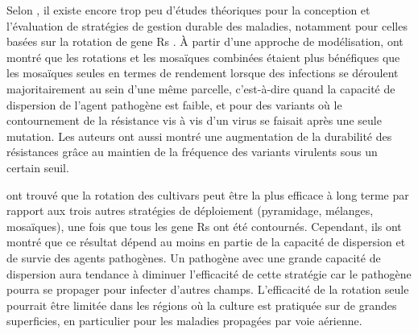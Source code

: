  Selon \citet{Zhan2015}, il existe encore trop peu d’études théoriques pour la conception et l’évaluation de stratégies  de gestion durable des maladies, notamment pour celles basées sur la rotation de \glspl{gene R} \citep{Fabre2015, Papaix2015, Lof2017, Rimbaud2018}. 
À partir d'une approche de modélisation, \citet{Fabre2015}  ont montré que les rotations et les mosaïques combinées  étaient plus bénéfiques que les mosaïques seules en termes de rendement lorsque des infections se déroulent majoritairement au sein d'une même parcelle, c'est-à-dire quand la capacité de dispersion de l'agent pathogène est faible, et pour des variants  où le contournement de la résistance vis à vis d'un virus se faisait après une seule mutation. Les auteurs ont aussi montré une augmentation de la durabilité des résistances grâce au maintien de  la fréquence des variants virulents sous un certain seuil.

	\citet{Rimbaud2018} ont trouvé que la rotation des cultivars peut être la plus efficace à long terme par rapport aux trois autres stratégies de déploiement (pyramidage, mélanges, mosaïques), une fois que tous les \glspl{gene R} ont été contournés. Cependant, ils ont montré que ce résultat dépend au moins en partie de la capacité de dispersion et de survie des agents pathogènes.  Un pathogène avec une grande capacité de dispersion aura tendance à diminuer l'efficacité de cette stratégie car le pathogène pourra se propager pour infecter d'autres champs. L'efficacité de la rotation   seule pourrait être limitée dans les régions où la culture est pratiquée sur de grandes superficies, en particulier pour les maladies propagées par voie aérienne.

